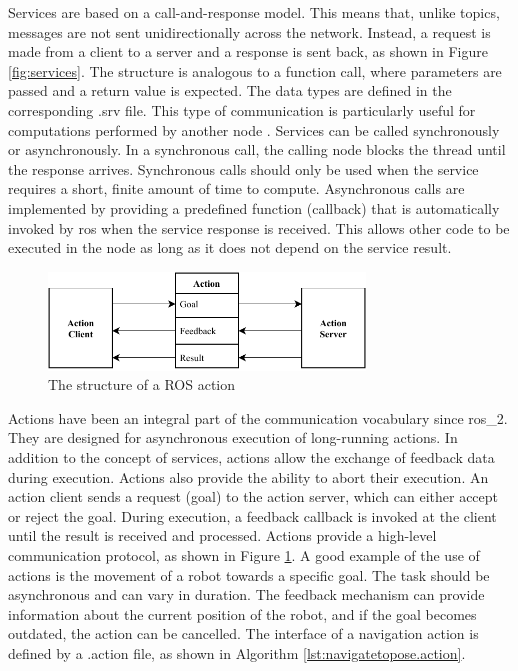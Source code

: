 Services are based on a call-and-response model. This means that, unlike topics, messages are not sent unidirectionally across the network. Instead, a request is made from a client to a server and a response is sent back, as shown in Figure \ref{fig:services}. The structure is analogous to a function call, where parameters are passed and a return value is expected. The data types are defined in the corresponding .srv file. This type of communication is particularly useful for computations performed by another node \cite[p. 51]{quigley_programming_2015}. Services can be called synchronously or asynchronously. In a synchronous call, the calling node blocks the thread until the response arrives. Synchronous calls should only be used when the service requires a short, finite amount of time to compute. Asynchronous calls are implemented by providing a predefined function (callback) that is automatically invoked by \gls{ros} when the service response is received. This allows other code to be executed in the node as long as it does not depend on the service result.
\begin{figure}[h]
    \centering
    \captionsetup{justification=centering}
    \includegraphics[width=0.75\textwidth]{figures/20_state_of_the_art/actions.pdf}
    \caption{The structure of a ROS action}
    \label{fig:actions}
\end{figure}
Actions have been an integral part of the communication vocabulary since \gls{ros_2}. They are designed for asynchronous execution of long-running actions. In addition to the concept of services, actions allow the exchange of feedback data during execution. Actions also provide the ability to abort their execution. An action client sends a request (goal) to the action server, which can either accept or reject the goal. During execution, a feedback callback is invoked at the client until the result is received and processed. Actions provide a high-level communication protocol, as shown in Figure \ref{fig:actions}. A good example of the use of actions is the movement of a robot towards a specific goal. The task should be asynchronous and can vary in duration. The feedback mechanism can provide information about the current position of the robot, and if the goal becomes outdated, the action can be cancelled. The interface of a navigation action is defined by a .action file, as shown in Algorithm \ref{lst:navigatetopose.action}.

